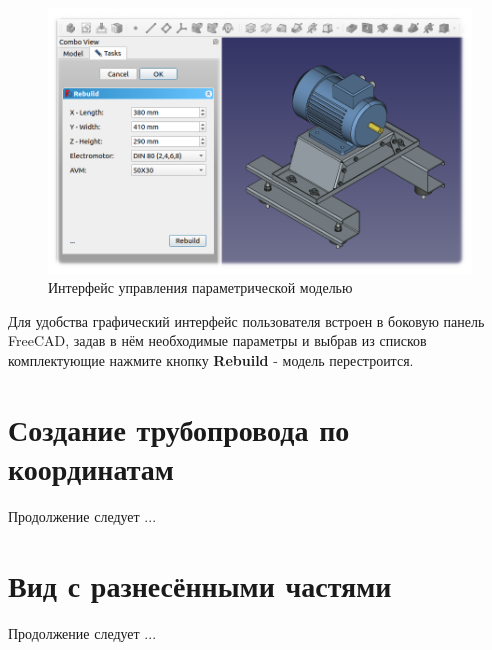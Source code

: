 \documentclass[a4paper,12pt]{article}
\begin{document}
\begin{figure}[htp]
\centering
\includegraphics[width=1.0\textwidth]{img/example_mc.png}
\caption{Интерфейс управления параметрической моделью}
\label{sec:example_mc}
\end{figure}

Для удобства графический интерфейс пользователя встроен в боковую панель FreeCAD, задав в нём необходимые параметры и выбрав из списков комплектующие нажмите кнопку \textbf{Rebuild} - модель перестроится.

\pagebreak



\section{Создание трубопровода по координатам}

Продолжение следует ...



\section{Вид с разнесёнными частями}

Продолжение следует ...

\end{document}
